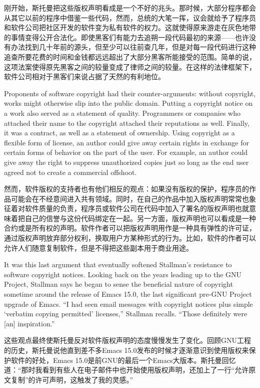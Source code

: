 \ifdefined\chs
刚开始，斯托曼把这些版权声明看成是一个不好的兆头。那时候，大部分程序都会从其它以前的程序中借鉴一些代码，然而，总统的大笔一挥，议会就给予了程序员和软件公司把社区开发的软件变为私有软件的权力。这就使得原来游走在灰色地带的事情变得公开合法化。即使黑客们有能力去追朔一段代码最初的来源——也许没有办法找到几十年前的源头，但至少可以往前查几年，但是对每一段代码进行这种追查所要花费的时间和金钱都远远超出了大部分黑客所能接受的范围。简单的说，这项法案使得原先黑客之间的较量变成了律师之间的较量。在这样的法律框架下，软件公司相对于黑客们来说占据了天然的有利地位。
\fi

\ifdefined\eng
Proponents of software copyright had their counter-arguments: without copyright, works might otherwise slip into the public domain. Putting a copyright notice on a work also served as a statement of quality. Programmers or companies who attached their name to the copyright attached their reputations as well. Finally, it was a contract, as well as a statement of ownership. Using copyright as a flexible form of license, an author could give away certain rights in exchange for certain forms of behavior on the part of the user. For example, an author could give away the right to suppress unauthorized copies just so long as the end user agreed not to create a commercial offshoot.
\fi

\ifdefined\chs
然而，软件版权的支持者也有他们相反的观点：如果没有版权的保护，程序员的作品可能会在不经意间进入共有领域。同时，在自己的作品中加入版权声明常常也象征着对软件质量的负责，程序员或软件公司在代码中加入了署名的版权声明也就意味着把自己的信誉与这份代码绑定在一起。另一方面，版权声明也可以看成是一种合约或是所有权的声明。软件作者可以把版权声明用作是一种具有弹性的许可证，通过版权声明放弃部分权利，换取用户方某种形式的行为。比如，软件的作者可以允许人们随意复制软件，但是不得把这些副本用于商业用途。
\fi

\ifdefined\eng
It was this last argument that eventually softened Stallman's resistance to software copyright notices. Looking back on the years leading up to the GNU Project, Stallman says he began to sense the beneficial nature of copyright sometime around the release of Emacs 15.0, the last significant pre-GNU Project upgrade of Emacs. ``I had seen email messages with copyright notices plus simple `verbatim copying permitted' licenses,'' Stallman recalls. ``Those definitely were [an] inspiration.''
\fi

\ifdefined\chs
这些观点最终使斯托曼反对软件版权声明的态度慢慢发生了变化。回顾GNU工程的历史，斯托曼说他直到差不多Emacs 15.0发布的时候才逐渐意识到使用版权来保护软件的好处，Emacs 15.0是前GNU的最后一个Emacs大版本。斯托曼回忆道：``那时我看到有些人在电子邮件中也开始使用版权声明，还加上了一行``允许原文复制''的许可声明，这触发了我的灵感。''
\fi


